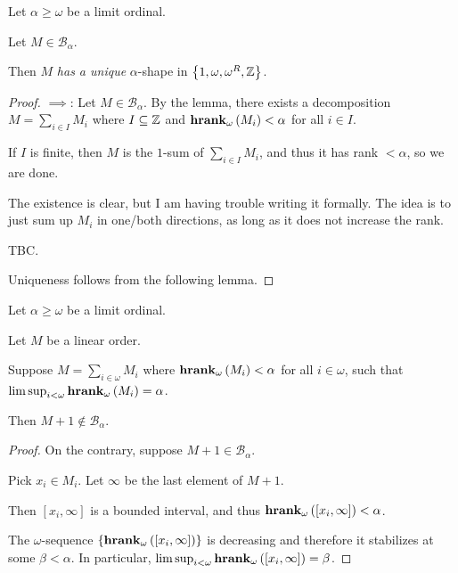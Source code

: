 \begin{lemma}
  Let $\alpha \ge \omega$ be a limit ordinal.

  Let $M \in \mathcal{B}_{\alpha}$.
  
  Then $M$ \emph{has a unique} $\alpha$-shape in $\left\{ {1, \omega, \omega^R, \mathbb{Z}} \right\}$.
\end{lemma}

\begin{proof}
  $\implies$: Let $M \in \mathcal{B}_{\alpha}$. By the lemma,
  there exists a decomposition $M = \sum_{i \in I} M_i$ where
  $I \subseteq \mathbb{Z}$ and $\mathbf{hrank}_{\omega}\left( M_i \right) < \alpha$ for all $i \in I$.

  If $I$ is finite, then $M$ is the $1$-sum of $\sum_{i \in I} M_i$,
  and thus it has rank $< \alpha$, so we are done.

  The existence is clear, but I am having trouble writing
  it formally. The idea is to just sum up $M_i$ in one/both directions,
  as long as it does not increase the rank.

  TBC.

  Uniqueness follows from the following lemma.
\end{proof}

\begin{lemma}
  Let $\alpha \ge \omega$ be a limit ordinal.

  Let $M$ be a linear order.
  
  Suppose $M = \sum_{i \in \omega} M_i$
  where $\mathbf{hrank}_{\omega}\left( M_i \right) < \alpha$ for all $i \in \omega$,
  such that $\limsup_{i < \omega}{\mathbf{hrank}_{\omega}\left( M_i \right)} = \alpha$.

  Then $M + 1 \notin \mathcal{B}_{\alpha}$.
\end{lemma}

\begin{proof}
  On the contrary, suppose $M + 1 \in \mathcal{B}_{\alpha}$.
  
  Pick $x_i \in M_i$. Let $\infty$ be the last element of $M + 1$.

  Then $[x_i, \infty]$ is a bounded interval, and thus
  $\mathbf{hrank}_{\omega}\left( [x_i, \infty] \right) < \alpha$.

  The $\omega$-sequence $\left\{ {\mathbf{hrank}_{\omega}\left( [x_i, \infty] \right)} \right\}$
  is decreasing and therefore it stabilizes at some $\beta < \alpha$.
  In particular, $\limsup_{i < \omega}{\mathbf{hrank}_{\omega}\left( [x_i, \infty] \right)} = \beta$.
\end{proof}
